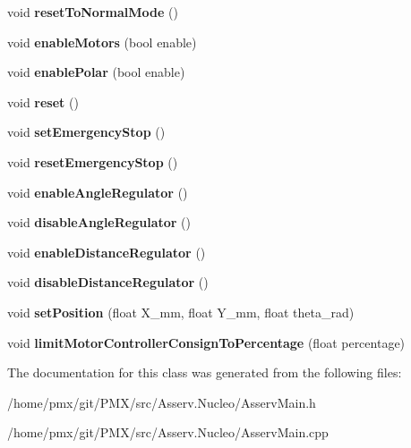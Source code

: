 \begin{DoxyCompactItemize}
\item 
\mbox{\label{classAsservMain_a6950c7167945ad045c70865a59579e0b}} 
void {\bfseries reset\+To\+Normal\+Mode} ()
\item 
\mbox{\label{classAsservMain_acf5e6298e7877e15efc20b5d7ea87602}} 
void {\bfseries enable\+Motors} (bool enable)
\item 
\mbox{\label{classAsservMain_a4cab29fc4a1736bf8686163a964f7c26}} 
void {\bfseries enable\+Polar} (bool enable)
\item 
\mbox{\label{classAsservMain_aafe3c2a78a3abe48d18bebac26dbe53a}} 
void {\bfseries reset} ()
\item 
\mbox{\label{classAsservMain_a5492788ba2d5f910fb988f651f5eb5a1}} 
void {\bfseries set\+Emergency\+Stop} ()
\item 
\mbox{\label{classAsservMain_a6ea6ae43a45dee3d782982a779f1cb96}} 
void {\bfseries reset\+Emergency\+Stop} ()
\item 
\mbox{\label{classAsservMain_a1c987dccffe45815a9b003f5ac85c0f4}} 
void {\bfseries enable\+Angle\+Regulator} ()
\item 
\mbox{\label{classAsservMain_a2a8446f9c8f651ed637e3abcf8112736}} 
void {\bfseries disable\+Angle\+Regulator} ()
\item 
\mbox{\label{classAsservMain_a33cba691e13e38a0419d283c37a0107c}} 
void {\bfseries enable\+Distance\+Regulator} ()
\item 
\mbox{\label{classAsservMain_adf728439645ce6ca7f9d39d3119dd8ad}} 
void {\bfseries disable\+Distance\+Regulator} ()
\item 
\mbox{\label{classAsservMain_a8a88a960bcedae7224bed1ce6509b755}} 
void {\bfseries set\+Position} (float X\+\_\+mm, float Y\+\_\+mm, float theta\+\_\+rad)
\item 
\mbox{\label{classAsservMain_a5e32d317afdaa0f133177c4a6cde0c19}} 
void {\bfseries limit\+Motor\+Controller\+Consign\+To\+Percentage} (float percentage)
\end{DoxyCompactItemize}


The documentation for this class was generated from the following files\+:\begin{DoxyCompactItemize}
\item 
/home/pmx/git/\+P\+M\+X/src/\+Asserv.\+Nucleo/Asserv\+Main.\+h\item 
/home/pmx/git/\+P\+M\+X/src/\+Asserv.\+Nucleo/Asserv\+Main.\+cpp\end{DoxyCompactItemize}
